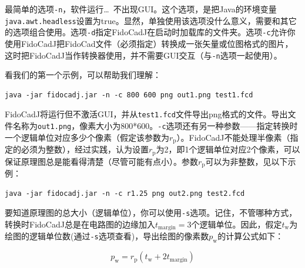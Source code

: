 \documentclass[10pt,a4paper,twoside]{scrreprt}
\begin{document}
最简单的选项\lstinline!-n!，软件运行\dots\ 不出现GUI。这个选项，是把Java的环境变量\lstinline!java.awt.headless!设置为true。显然，单独使用该选项没什么意义，需要和其它的选项组合使用。选项\lstinline!-d!指定FidoCadJ在启动时加载库的文件夹。选项\lstinline!-c!允许你使用FidoCadJ把FidoCad文件（必须指定）转换成一张矢量或位图格式的图片，这时把FidoCadJ当作转换器使用，并不需要GUI交互（与\lstinline!-n!选项一起使用）。

看我们的第一个示例，可以帮助我们理解：
	 	
\begin{lstlisting}
java -jar fidocadj.jar -n -c 800 600 png out1.png test1.fcd
\end{lstlisting}

FidoCadJ将运行但不激活GUI，并从\lstinline!test1.fcd!文件导出png格式的文件。导出文件名称为\lstinline!out1.png!，像素大小为800*600。\lstinline!-c!选项还有另一种参数——指定转换时一个逻辑单位对应多少个像素（假定该参数为$r_\mathrm{p}$）。FidoCadJ不能处理半像素（指定的必须为整数），经过实践，认为设置$r_\mathrm{p}$为2，即1个逻辑单位对应2个像素，可以保证原理图总是能看得清楚（尽管可能有点小）。参数$r_\mathrm{p}$可以为非整数，见以下示例：

\begin{lstlisting}
java -jar fidocadj.jar -n -c r1.25 png out2.png test2.fcd
\end{lstlisting}

要知道原理图的总大小（逻辑单位），你可以使用\lstinline!-s!选项。记住，不管哪种方式，转换时FidoCadJ总是在电路图的边缘加入$t_\mathrm{margin}=3$个逻辑单位。因此，假定$t_\mathrm{w}$为绘图的逻辑单位数(通过\lstinline!-s!选项查看)，导出绘图的像素数$p_\mathrm{w}$的计算公式如下：

\begin{equation}
p_\mathrm{w} = r_\mathrm{p} (t_\mathrm{w}+ 2 t_\mathrm{margin})
\end{equation}
\end{document}
